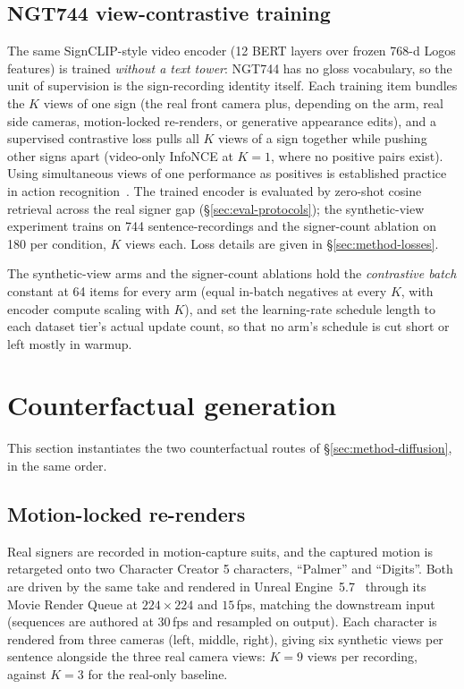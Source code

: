 \subsection{NGT744 view-contrastive training}
The same SignCLIP-style
video encoder (12 BERT layers over frozen 768-d Logos features) is
trained \emph{without a text tower}: NGT744 has no gloss vocabulary, so the
unit of supervision is the sign-recording identity itself. Each training
item bundles the $K$ views of one sign (the real front camera plus,
depending on the arm, real side cameras, motion-locked re-renders, or
generative appearance edits), and a supervised contrastive loss pulls all $K$
views of a sign together while pushing other signs apart (video-only
InfoNCE at $K{=}1$, where no positive pairs exist).
Using simultaneous views of one performance as positives is established
practice in action recognition~\cite{shahMultiViewActionRecognition2023}.
The trained encoder
is evaluated by zero-shot cosine retrieval across the real signer gap
(\S\ref{sec:eval-protocols}); the synthetic-view experiment trains on 744
sentence-recordings and the signer-count ablation on 180 per condition,
$K$ views each. Loss details are given in \S\ref{sec:method-losses}.

The synthetic-view arms and the signer-count ablations hold the
\emph{contrastive batch} constant at 64 items for every arm
(equal in-batch negatives at every $K$, with encoder compute scaling
with $K$), and set the learning-rate schedule length to each
dataset tier's actual update count, so that no arm's schedule is cut
short or left mostly in warmup.


\section{Counterfactual generation}
\label{sec:setup-generation}
This section instantiates the two counterfactual routes of
\S\ref{sec:method-diffusion}, in the same order.
\subsection{Motion-locked re-renders}
Real signers are recorded in motion-capture suits, and the captured motion
is retargeted onto two Character Creator 5 characters, ``Palmer'' and
``Digits''. Both are driven by the same take and rendered in Unreal
Engine~5.7~\cite{UnrealEngine57} through its Movie Render Queue at
$224\times224$ and $15$\,fps, matching the downstream input (sequences are
authored at $30$\,fps and resampled on output). Each character is rendered
from three cameras (left, middle, right), giving six synthetic views per
sentence alongside the three real camera views: $K=9$ views per recording,
against $K=3$ for the real-only baseline.

